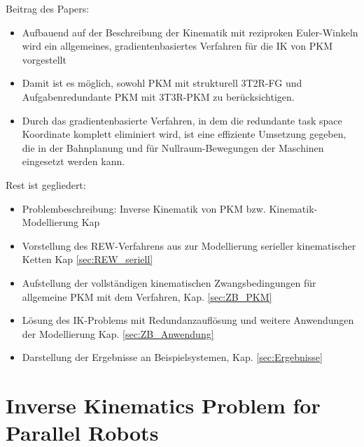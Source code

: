 \documentclass[robotics,article,submit,moreauthors,pdftex]{Definitions/mdpi}
\begin{document}
Beitrag des Papers:
\begin{itemize}
	\item Aufbauend auf der Beschreibung der Kinematik mit reziproken Euler-Winkeln \cite{1_SchapplerTapOrt2019} wird ein allgemeines, gradientenbasiertes Verfahren für die IK von PKM vorgestellt
	\item Damit ist es möglich, sowohl PKM mit strukturell 3T2R-FG und Aufgabenredundante PKM mit 3T3R-PKM zu berücksichtigen.
	\item Durch das gradientenbasierte Verfahren, in dem die redundante task space Koordinate komplett eliminiert wird, ist eine effiziente Umsetzung gegeben, die in der Bahnplanung und für Nullraum-Bewegungen der Maschinen eingesetzt werden kann.
\end{itemize}

Rest ist gegliedert:

\begin{itemize}
    \item Problembeschreibung: Inverse Kinematik von PKM bzw. Kinematik-Modellierung Kap \label{ref:PKM_general}
	\item Vorstellung des REW-Verfahrens aus \cite{1_SchapplerTapOrt2019} zur Modellierung serieller kinematischer Ketten Kap \ref{sec:REW_seriell}
	\item Aufstellung der vollständigen kinematischen Zwangsbedingungen für allgemeine PKM mit dem Verfahren, Kap. \ref{sec:ZB_PKM}
	\item Lösung des IK-Problems mit Redundanzauflösung und weitere Anwendungen der Modellierung Kap. \ref{sec:ZB_Anwendung}
	\item Darstellung der Ergebnisse an Beispielsystemen, Kap. \ref{sec:Ergebnisse}
\end{itemize}


\section{Inverse Kinematics Problem for Parallel Robots}
\label{sec:PKM_general}
\end{document}
